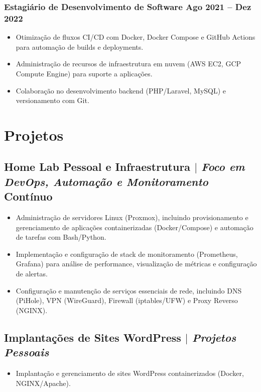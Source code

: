 \documentclass[11pt]{article} %
\begin{document}
\subsubsection{Estagiário de Desenvolvimento de Software \hfill Ago 2021 -- Dez 2022}
\begin{itemize}
    \item Otimização de fluxos CI/CD com Docker, Docker Compose e GitHub Actions para automação de builds e deployments. %
    \item Administração de recursos de infraestrutura em nuvem (AWS EC2, GCP Compute Engine) para suporte a aplicações. %
    \item Colaboração no desenvolvimento backend (PHP/Laravel, MySQL) e versionamento com Git. %
\end{itemize}

\section{Projetos}
\subsection{Home Lab Pessoal e Infraestrutura $|$ {\normalfont\itshape Foco em DevOps, Automação e Monitoramento} \hfill Contínuo}
\begin{itemize}
    \item Administração de servidores Linux (Proxmox), incluindo provisionamento e gerenciamento de aplicações containerizadas (Docker/Compose) e automação de tarefas com Bash/Python. %
    \item Implementação e configuração de stack de monitoramento (Prometheus, Grafana) para análise de performance, visualização de métricas e configuração de alertas. %
    \item Configuração e manutenção de serviços essenciais de rede, incluindo DNS (PiHole), VPN (WireGuard), Firewall (iptables/UFW) e Proxy Reverso (NGINX). %
\end{itemize}

\subsection{Implantações de Sites WordPress $|$ {\normalfont\itshape Projetos Pessoais} \hfill }
\begin{itemize}
    \item Implantação e gerenciamento de sites WordPress containerizados (Docker, NGINX/Apache). %
\end{itemize}
\end{document}
